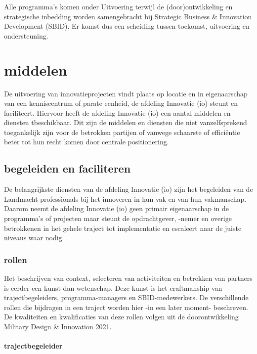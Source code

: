 \documentclass[
]{book}
\begin{document}
Alle programma's komen onder Uitvoering terwijl de (door)ontwikkeling en strategische inbedding worden samengebracht bij Strategic Business \& Innovation Development (SBID). Er komst dus een scheiding tussen toekomst, uitvoering en ondersteuning.

\hypertarget{middelen}{%
\section{middelen}\label{middelen}}

De uitvoering van innovatieprojecten vindt plaats op locatie en in eigenaarschap van een kenniscentrum of parate eenheid, de afdeling Innovatie (io) steunt en faciliteert. Hiervoor heeft de afdeling Innovatie (io) een aantal middelen en diensten tbeschikbaar. Dit zijn de middelen en diensten die niet vanzelfsprekend toegankelijk zijn voor de betrokken partijen of vanwege schaarste of efficiëntie beter tot hun recht komen door centrale positionering.

\hypertarget{begeleiden-en-faciliteren}{%
\subsection{begeleiden en faciliteren}\label{begeleiden-en-faciliteren}}

De belangrijkste diensten van de afdeling Innovatie (io) zijn het begeleiden van de Landmacht-professionals bij het innoveren in hun vak en van hun vakmanschap. Daarom neemt de afdeling Innovatie (io) geen primair eigenaarschap in de programma's of projecten maar steunt de opdrachtgever, -nemer en overige betrokkenen in het gehele traject tot implementatie en escaleert naar de juiste niveaus waar nodig.

\hypertarget{rollen}{%
\subsubsection{rollen}\label{rollen}}

Het beschrijven van context, selecteren van activiteiten en betrekken van partners is eerder een kunst dan wetenschap. Deze kunst is het craftmanship van trajectbegeleiders, programma-managers en SBID-medewerkers. De verschillende rollen die bijdragen in een traject worden hier -in een later moment- beschreven. De kwaliteiten en kwalificaties van deze rollen volgen uit de doorontwikkeling Military Design \& Innovation 2021.

\hypertarget{trajectbegeleider}{%
\paragraph*{trajectbegeleider}\label{trajectbegeleider}}
\end{document}

